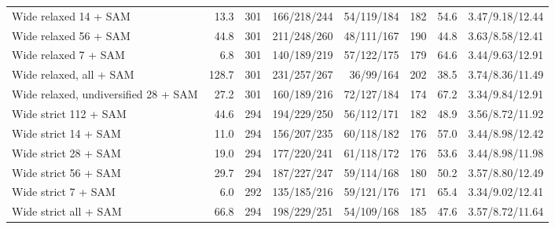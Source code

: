 \begin{tabular}{lrrrrrrr}
Wide relaxed 14 + SAM & 13.3 & 301 & 166/218/244 & 54/119/184 & 182 & 54.6 & 3.47/9.18/12.44 \\
Wide relaxed 56 + SAM & 44.8 & 301 & 211/248/260 & 48/111/167 & 190 & 44.8 & 3.63/8.58/12.41 \\
Wide relaxed 7 + SAM & 6.8 & 301 & 140/189/219 & 57/122/175 & 179 & 64.6 & 3.44/9.63/12.91 \\
Wide relaxed, all + SAM & 128.7 & 301 & 231/257/267 & 36/99/164 & 202 & 38.5 & 3.74/8.36/11.49 \\
Wide relaxed, undiversified 28 + SAM & 27.2 & 301 & 160/189/216 & 72/127/184 & 174 & 67.2 & 3.34/9.84/12.91 \\
Wide strict 112 + SAM & 44.6 & 294 & 194/229/250 & 56/112/171 & 182 & 48.9 & 3.56/8.72/11.92 \\
Wide strict 14 + SAM & 11.0 & 294 & 156/207/235 & 60/118/182 & 176 & 57.0 & 3.44/8.98/12.42 \\
Wide strict 28 + SAM & 19.0 & 294 & 177/220/241 & 61/118/172 & 176 & 53.6 & 3.44/8.98/11.98 \\
Wide strict 56 + SAM & 29.7 & 294 & 187/227/247 & 59/114/168 & 180 & 50.2 & 3.57/8.80/12.49 \\
Wide strict 7 + SAM & 6.0 & 292 & 135/185/216 & 59/121/176 & 171 & 65.4 & 3.34/9.02/12.41 \\
Wide strict all + SAM & 66.8 & 294 & 198/229/251 & 54/109/168 & 185 & 47.6 & 3.57/8.72/11.64 \\
\bottomrule
\end{tabular}
